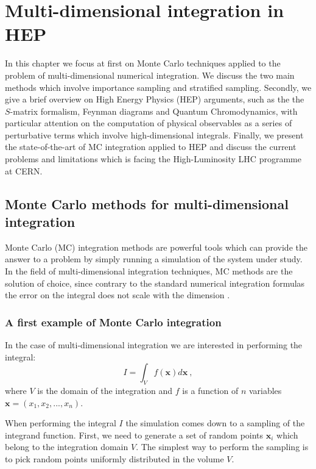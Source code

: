 \documentclass[../main/main.tex]{subfiles}
\begin{document}
\chapter[Multi-dimensional integration in HEP]{Multi-dimensional integration in HEP}
In this chapter we focus at first on Monte Carlo techniques applied to the problem of multi-dimensional numerical integration.
We discuss the two main methods which involve importance sampling and stratified sampling.
Secondly, we give a brief overview on High Energy Physics (HEP) arguments, such as the the $S$-matrix formalism, Feynman diagrams and Quantum Chromodynamics, with particular attention 
on the computation of physical observables as a series of perturbative terms which involve high-dimensional integrals.
Finally, we present the state-of-the-art of  MC integration applied to HEP and discuss the current problems and limitations which
is facing the High-Luminosity LHC programme at CERN.

\section[MC methods for multi-dimensional integration]{Monte Carlo methods for multi-dimensional integration}
Monte Carlo (MC) integration methods are powerful tools which can provide the answer to a 
problem by simply running a simulation of the system under study.
In the field of multi-dimensional integration techniques, MC methods are the solution of choice, since contrary 
to the standard numerical integration formulas  the error on the integral does not scale with the dimension \cite{Press:1992zz}. 


\subsection{A first example of Monte Carlo integration}
In the case of multi-dimensional integration we are interested in performing the
integral:
\begin{equation}
	I = \int_{V}   f(\textbf{x}) d \textbf{x} \ , 
\end{equation}
where $V$ is the domain of the integration and $f$ is a function of $n$ variables 
$\textbf{x} = (x_1,x_2, ..., x_n)$.

When performing the integral $I$ the simulation comes down to a sampling of the integrand function.
First, we need to generate a set of random points $\textbf{x}_i$ which belong to the integration domain $V$.
The simplest way to perform the sampling is to pick random points uniformly distributed 
in the volume $V$.
\end{document}
